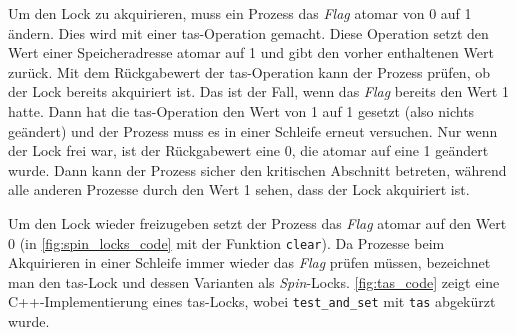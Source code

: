 Um den Lock zu akquirieren,
muss ein Prozess das \textit{Flag} atomar von 0 auf 1 ändern.
Dies wird mit einer \gls{tas}-Operation gemacht.
Diese Operation setzt den Wert einer Speicheradresse atomar auf 1 und gibt den vorher enthaltenen Wert zurück.
Mit dem Rückgabewert der \gls{tas}-Operation kann der Prozess prüfen,
ob der Lock bereits akquiriert ist.
Das ist der Fall,
wenn das \textit{Flag} bereits den Wert 1 hatte.
Dann hat die \gls{tas}-Operation den Wert von 1 auf 1 gesetzt (also nichts geändert)
und der Prozess muss es in einer Schleife erneut versuchen.
Nur wenn der Lock frei war,
ist der Rückgabewert eine 0,
die atomar auf eine 1 geändert wurde.
Dann kann der Prozess sicher den kritischen Abschnitt betreten,
während alle anderen Prozesse durch den Wert 1 sehen,
dass der Lock akquiriert ist.

Um den Lock wieder freizugeben setzt der Prozess das \textit{Flag} atomar auf den Wert 0
(in \autoref{fig:spin_locks_code} mit der Funktion \texttt{clear}).
Da Prozesse beim Akquirieren in einer Schleife immer wieder das \textit{Flag} prüfen müssen,
bezeichnet man den \gls{tas}-Lock und dessen Varianten als \textit{Spin}-Locks.
\autoref{fig:tas_code} zeigt eine C++-Implementierung eines \gls{tas}-Locks,
wobei \texttt{test\_and\_set} mit \texttt{tas} abgekürzt wurde.

